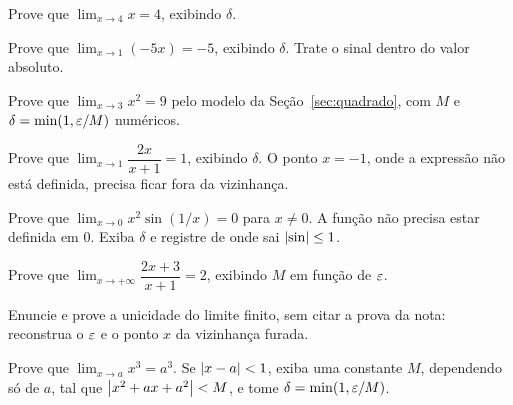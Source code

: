\documentclass[11pt,a4paper]{article}
\begin{document}
\begin{exercicio}
Prove que $\lim_{x\to 4}x=4$, exibindo $\delta$.
\end{exercicio}

\begin{exercicio}
Prove que $\lim_{x\to 1}(-5x)=-5$, exibindo $\delta$. Trate o sinal dentro do valor absoluto.
\end{exercicio}

\begin{exercicio}
Prove que $\lim_{x\to 3}x^2=9$ pelo modelo da Se\c{c}\~ao~\ref{sec:quadrado}, com $M$ e $\delta=\min(1,\varepsilon/M)$ num\'ericos.
\end{exercicio}

\begin{exercicio}
Prove que $\lim_{x\to 1}\dfrac{2x}{x+1}=1$, exibindo $\delta$. O ponto $x=-1$, onde a express\~ao n\~ao est\'a definida, precisa ficar fora da vizinhan\c{c}a.
\end{exercicio}

\begin{exercicio}
Prove que $\lim_{x\to 0}x^2\sin(1/x)=0$ para $x\neq 0$. A fun\c{c}\~ao n\~ao precisa estar definida em $0$. Exiba $\delta$ e registre de onde sai $\left\lvert \sin \right\rvert\le 1$.
\end{exercicio}

\begin{exercicio}
Prove que $\lim_{x\to +\infty}\dfrac{2x+3}{x+1}=2$, exibindo $M$ em fun\c{c}\~ao de $\varepsilon$.
\end{exercicio}

\begin{exercicio}
Enuncie e prove a unicidade do limite finito, sem citar a prova da nota: reconstrua o $\varepsilon$ e o ponto $x$ da vizinhan\c{c}a furada.
\end{exercicio}

\begin{exercicio}
Prove que $\lim_{x\to a}x^3=a^3$. Se $\left\lvert x-a \right\rvert<1$, exiba uma constante $M$, dependendo s\'o de $a$, tal que $\left\lvert x^2+ax+a^2 \right\rvert<M$, e tome $\delta=\min(1,\varepsilon/M)$.
\end{exercicio}
\end{document}
